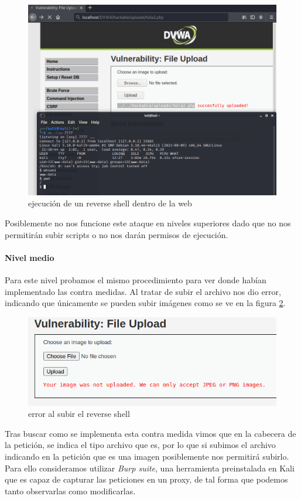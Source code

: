 \begin{figure}[ht!]
    \centering
    \includegraphics[width=14cm]{img/upload/low.png}
    \caption{ejecución de un reverse shell dentro de la web}
    \label{fig:reverseshell}
\end{figure} 
Posiblemente no nos funcione este ataque en niveles superiores dado que no nos permitirán subir scripts o 
no nos darán permisos de ejecución.
\paragraph{Nivel medio} Para este nivel probamos el mismo procedimiento para ver donde
habían implementado las contra medidas. Al tratar de subir el archivo nos dio error, indicando que
únicamente se pueden subir imágenes como se ve en la figura \ref{fig:onlyimages}.
\begin{figure}[ht!]
    \centering
    \includegraphics[width=14cm]{img/upload/only images.png}
    \caption{error al subir el reverse shell}
    \label{fig:onlyimages}
\end{figure} 
Tras buscar como se implementa esta contra medida vimos que en la cabecera de la petición,
se indica el tipo archivo que es, por lo que si subimos el archivo indicando en la petición que es 
una imagen posiblemente nos permitirá subirlo. Para ello consideramos utilizar {\it Burp suite}, una herramienta
preinstalada en Kali que es capaz de capturar las peticiones en un proxy, de tal forma que podemos tanto
observarlas como modificarlas.
